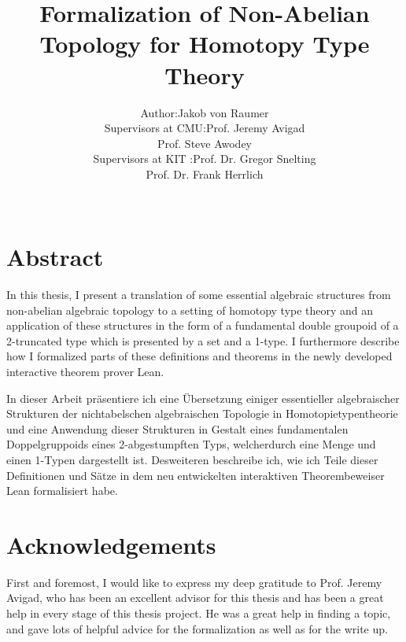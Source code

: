 \documentclass[12pt,headings=optiontohead]{book}
\theoremstyle{definition}
\begin{document}
\title{Formalization of Non-Abelian Topology for Homotopy Type Theory}
\author{\begin{tabular}{r@{ }l} 
Author:      & Jakob von Raumer \\[1ex] 
Supervisors at CMU: & Prof. Jeremy Avigad\\
             & Prof. Steve Awodey \\[1ex]
Supervisors at KIT : & Prof. Dr. Gregor Snelting\\
			& Prof. Dr. Frank Herrlich
\end{tabular}\\
}

\frontmatter
\maketitle

\chapter*{Abstract}

In this thesis, I present a translation of some essential algebraic structures
from non-abelian algebraic topology to a setting of homotopy type theory and
an application of these structures in the form of a fundamental double groupoid
of a 2-truncated type which is presented by a set and a 1-type.
I furthermore describe how I formalized parts of these definitions and theorems
in the newly developed interactive theorem prover Lean. \newline

\noindent
In dieser Arbeit präsentiere ich eine Übersetzung einiger essentieller algebraischer
Strukturen der nichtabelschen algebraischen Topologie in Homotopietypentheorie
und eine Anwendung dieser Strukturen in Gestalt eines fun\-da\-men\-talen Doppel\-grupp\-oids
eines 2-ab\-gestumpften Typs, welch\-er\linebreak durch ei\-ne Men\-ge und ei\-nen 1-Typ\-en dargestellt ist.
Des\-weiteren be\-schrei\-be ich, wie ich Tei\-le dieser Definitionen und Sätze in dem
neu entwickelten inter\-aktiven Theorem\-beweiser Lean for\-mali\-siert habe.

\chapter*{Acknowledgements}

First and foremost, I would like to express my deep gratitude to Prof. Jeremy Avigad,
who has been an excellent advisor for this thesis and has been a great help
in every stage of this thesis project.
He was a great help in finding a topic, and gave lots of helpful advice for the
formalization as well as for the write up.
\end{document}
